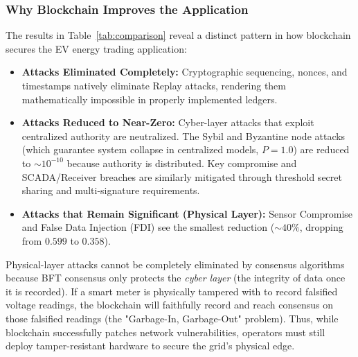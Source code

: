 \documentclass[10pt,twocolumn,journal]{IEEEtran}
\begin{document}
\subsubsection{Why Blockchain Improves the Application}

The results in Table~\ref{tab:comparison} reveal a distinct pattern in how blockchain secures the EV energy trading application:
\begin{itemize}[leftmargin=*]
    \item \textbf{Attacks Eliminated Completely:} Cryptographic sequencing, nonces, and timestamps natively eliminate Replay attacks, rendering them mathematically impossible in properly implemented ledgers.
    \item \textbf{Attacks Reduced to Near-Zero:} Cyber-layer attacks that exploit centralized authority are neutralized. The Sybil and Byzantine node attacks (which guarantee system collapse in centralized models, $P=1.0$) are reduced to $\sim 10^{-10}$ because authority is distributed. Key compromise and SCADA/Receiver breaches are similarly mitigated through threshold secret sharing and multi-signature requirements.
    \item \textbf{Attacks that Remain Significant (Physical Layer):} Sensor Compromise and False Data Injection (FDI) see the smallest reduction ($\sim 40\%$, dropping from $0.599$ to $0.358$). 
\end{itemize}

Physical-layer attacks cannot be completely eliminated by consensus algorithms because BFT consensus only protects the \emph{cyber layer} (the integrity of data once it is recorded). If a smart meter is physically tampered with to record falsified voltage readings, the blockchain will faithfully record and reach consensus on those falsified readings (the "Garbage-In, Garbage-Out" problem). Thus, while blockchain successfully patches network vulnerabilities, operators must still deploy tamper-resistant hardware to secure the grid's physical edge.
\end{document}
